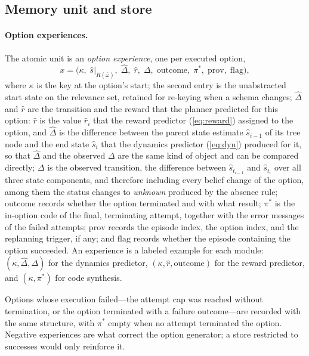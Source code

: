 \documentclass[11pt]{article}
\newcommand{\Rel}{R}
\newcommand{\shat}{\hat{s}}
\newcommand{\prov}{\mathrm{prov}}
\begin{document}
\subsection{Memory unit and store}
\label{sec:type2-unit}

\paragraph{Option experiences.}
The atomic unit is an \emph{option experience}, one per executed option,
\begin{equation}
x=\big(\kappa,\;\shat|_{\Rel(\bar\omega)},\;\hat\Delta,\;\hat r,\;\Delta,\;\mathrm{outcome},\;\pi^{\ast},\;\prov,\;\mathrm{flag}\big),
\label{eq:experience}
\end{equation}
where $\kappa$ is the key at the option's start; the second entry is the unabstracted start state on the relevance set, retained for re-keying when a schema changes; $\hat\Delta$ and $\hat r$ are the transition and the reward that the planner predicted for this option: $\hat r$ is the value $\hat r_i$ that the reward predictor (\ref{eq:reward}) assigned to the option, and $\hat\Delta$ is the difference between the parent state estimate $\shat_{i-1}$ of its tree node and the end state $\shat_i$ that the dynamics predictor (\ref{eq:dyn}) produced for it, so that $\hat\Delta$ and the observed $\Delta$ are the same kind of object and can be compared directly; $\Delta$ is the observed transition, the difference between $\shat_{t_{i-1}}$ and $\shat_{t_i}$ over all three state components, and therefore including every belief change of the option, among them the status changes to \emph{unknown} produced by the absence rule; $\mathrm{outcome}$ records whether the option terminated and with what result; $\pi^\ast$ is the in-option code of the final, terminating attempt, together with the error messages of the failed attempts; $\prov$ records the episode index, the option index, and the replanning trigger, if any; and $\mathrm{flag}$ records whether the episode containing the option succeeded. An experience is a labeled example for each module: $(\kappa,\hat\Delta,\Delta)$ for the dynamics predictor, $(\kappa,\hat r,\mathrm{outcome})$ for the reward predictor, and $(\kappa,\pi^\ast)$ for code synthesis.

Options whose execution failed---the attempt cap was reached without termination, or the option terminated with a failure outcome---are recorded with the same structure, with $\pi^\ast$ empty when no attempt terminated the option. Negative experiences are what correct the option generator; a store restricted to successes would only reinforce it.
\end{document}
